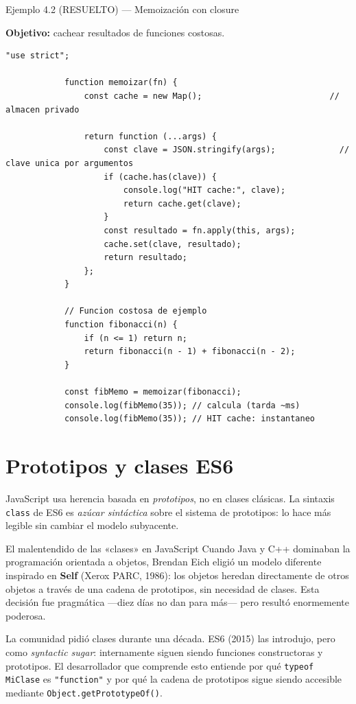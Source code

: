 \documentclass[11pt,a4paper,openany]{book}
\begin{document}
	\begin{cajaejemplo}{Ejemplo 4.2 (RESUELTO) — Memoización con closure}
		
		\textbf{Objetivo:} cachear resultados de funciones costosas.
		
		\begin{lstlisting}[style=js,caption={Memoización genérica},label=lst:4.8]
			"use strict";
			
			function memoizar(fn) {
				const cache = new Map();                          // almacen privado
				
				return function (...args) {
					const clave = JSON.stringify(args);             // clave unica por argumentos
					if (cache.has(clave)) {
						console.log("HIT cache:", clave);
						return cache.get(clave);
					}
					const resultado = fn.apply(this, args);
					cache.set(clave, resultado);
					return resultado;
				};
			}
			
			// Funcion costosa de ejemplo
			function fibonacci(n) {
				if (n <= 1) return n;
				return fibonacci(n - 1) + fibonacci(n - 2);
			}
			
			const fibMemo = memoizar(fibonacci);
			console.log(fibMemo(35)); // calcula (tarda ~ms)
			console.log(fibMemo(35)); // HIT cache: instantaneo
		\end{lstlisting}
		
	\end{cajaejemplo}
	
	\section{Prototipos y clases ES6}
	\label{sec:4.clases}
	
	JavaScript usa herencia basada en \emph{prototipos}, no en clases
	clásicas. La sintaxis \texttt{class} de ES6 es \emph{azúcar
		sintáctica} sobre el sistema de prototipos: lo hace más legible
	sin cambiar el modelo subyacente.
	
	\begin{cajahistoria}{El malentendido de las «clases» en JavaScript}
		Cuando Java y C++ dominaban la programación orientada a objetos,
		Brendan Eich eligió un modelo diferente inspirado en
		\textbf{Self} (Xerox PARC, 1986): los objetos heredan directamente
		de otros objetos a través de una cadena de prototipos, sin
		necesidad de clases. Esta decisión fue pragmática —diez días no
		dan para más— pero resultó enormemente poderosa.
		
		La comunidad pidió clases durante una década. ES6 (2015) las
		introdujo, pero como \emph{syntactic sugar}: internamente siguen
		siendo funciones constructoras y prototipos. El desarrollador
		que comprende esto entiende por qué
		\texttt{typeof} \texttt{MiClase} es \texttt{"function"} y por qué
		la cadena de prototipos sigue siendo accesible mediante
		\texttt{Object.getPrototypeOf()}.
	\end{cajahistoria}
	
\end{document}
